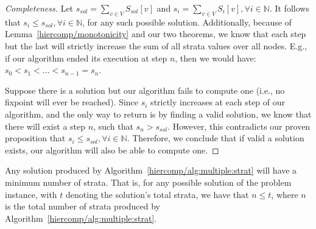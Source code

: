 \begin{proof}[Completeness]

  \noindent
  Let $s_{sol} = \sum_{v \in V} S_{sol}[v]$ and $s_{i} = \sum_{v \in
    V} S_{i}[v], \forall i \in \mathbb{N}$. It follows that $s_i \leq
  s_{sol}, \forall i \in \mathbb{N}$, for any such possible
  solution. Additionally, because of Lemma~\ref{hiercomp/monotonicity} and our
  two theorems, we know
  that each step but the last will strictly increase the sum of all
  strata values over all nodes. E.g., if our algorithm ended its
  execution at step $n$,
  then we would have: $s_0 < s_1 < \ldots < s_{n-1} = s_n$.


  Suppose there is a solution but our algorithm fails to compute one
  (i.e., no fixpoint will ever be reached). Since $s_{i}$ strictly
  increases at each step of our algorithm, and the only way to return
  is by finding a valid solution, we know that there will exist a step
  $n$, such that $s_n > s_{sol}$. However, this contradicts our proven
  proposition that $s_i \leq s_{sol}, \forall i \in
  \mathbb{N}$. Therefore, we conclude that if valid a solution exists,
  our algorithm will also be able to compute one.

\end{proof}

\vfill\eject
\begin{thm}[Principality]
  Any solution produced by Algorithm~\ref{hiercomp/alg:multiple:strat}
  will have a minimum number of strata. That is, for any possible
  solution of the problem instance, with $t$ denoting the solution's
  total strata, we have that $n \leq t$, where $n$ is the total number
  of strata produced by Algorithm~\ref{hiercomp/alg:multiple:strat}.
\end{thm}

